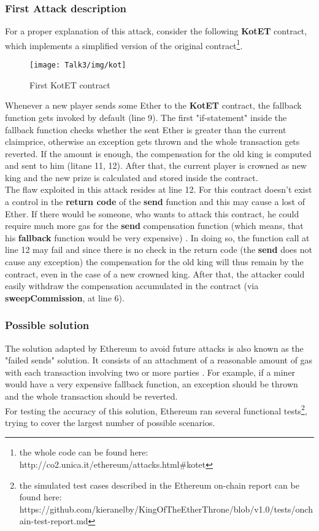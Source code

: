 \subsubsection{First Attack description}
For a proper explanation of this attack, consider the following \textbf{KotET} contract, which implements a simplified version of the original contract\footnote{the whole code can be found here: http://co2.unica.it/ethereum/attacks.html\#kotet}.   
\begin{figure}[H]
\begin{center}
\texttt{[image: Talk3/img/kot]}
\end{center}
\caption{First KotET contract}
\label{label}
\end{figure}
Whenever a new player sends some Ether to the \textbf{KotET} contract, the fallback function gets invoked by default (line 9). The first "if-statement" inside the fallback function checks whether the sent Ether is greater than the current claimprice, otherwise an exception gets thrown and the whole transaction gets reverted. If the amount is enough, the compensation for the old king is computed and sent to him (litane 11, 12). After that, the current player is crowned as new king and the new prize is calculated and stored inside the contract\cite{paper2}. \\
The flaw exploited in this attack resides at line 12. For this contract doesn't exist a control in the \textbf{return code} of the \textbf{send} function \cite{kotetIT} 
and this may cause a lost of Ether.
If there would be someone, who wants to attack this contract, he could require much more gas for the \textbf{send} compensation function (which means, that his \textbf{fallback} function would be very expensive) \cite{kotetIT}. In doing so, the function call at line 12 may fail and since there is no check in the return code (the \textbf{send} does not cause any exception) the compensation for the old king will thus remain by the contract, even in the case of a new crowned king. 
After that, the attacker could easily withdraw the compensation accumulated in the contract (via \textbf{sweepCommission}, at line 6).  

\subsubsection{Possible solution}
The solution adapted by Ethereum to avoid future attacks is also known as the "failed sends" solution. It consists of an attachment of a reasonable amount of gas with each transaction involving two or more parties \cite{koetXD}. 
For example, if a miner would have a very expensive fallback function, an exception should be thrown and the whole transaction should be reverted. \\
 For testing the accuracy of this solution, Ethereum ran several functional tests\footnote{the simulated test cases described in the Ethereum on-chain report can be found here: https://github.com/kieranelby/KingOfTheEtherThrone/blob/v1.0/tests/onchain-test-report.md}, trying to cover the largest number of possible scenarios. 


